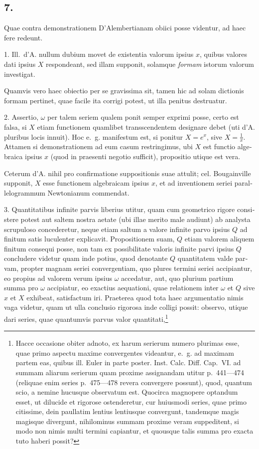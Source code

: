 \documentclass[12pt,a4paper]{article}
\begin{document}
\begin{otherlanguage}{latin}
\subsection*{7.}
Quae contra demonstrationem D'Alembertianam obiici posse videntur, ad haec fere redeunt.

1. Ill.~d'A. nullum dubium movet de existentia valorum ipsius $x$, quibus valores dati ipsius $X$ respondeant, sed illam supponit, solamque \textit{formam} istorum valorum investigat.

Quamvis vero haec obiectio per se gravissima sit, tamen hic ad solam dictionis formam pertinet, quae facile ita corrigi potest, ut illa penitus destruatur.

2. Assertio, $\omega$ per talem seriem qualem ponit semper exprimi posse, certo est falsa, si $X$ etiam functionem quamlibet transscendentem designare debet (uti d'A. pluribus locis innuit). Hoc e.~g. manifestum est, si ponitur $X=e^{x}$, sive $X=\frac{1}{x}$. Attamen si demonstrationem ad eum casum restringimus, ubi $X$ est functio algebraica ipsius $x$ (quod in praesenti negotio sufficit), propositio utique est vera.

Ceterum d'A. nihil pro confirmatione suppositionis suae attulit; cel. Bougainville supponit, $X$ esse functionem algebraicam ipsius $x$, et ad inventionem seriei parallelogrammum Newtonianum commendat.

3. Quantitatibus infinite parvis liberius utitur, quam cum geometrico rigore consistere potest aut saltem nostra aetate (ubi illae merito male audiunt) ab analysta scrupuloso concederetur, neque etiam saltum a valore infinite parvo ipsius $Q$ ad finitum satis luculenter explicavit. Propositionem suam, $Q$ etiam valorem aliquem finitum consequi posse, non tam ex possibilitate valoris infinite parvi ipsius $Q$ concludere videtur quam inde potius, quod denotante $Q$ quantitatem valde parvam, propter magnam seriei convergentiam, quo plures termini seriei accipiantur, eo propius ad valorem verum ipsius $\omega$ accedatur, aut, quo plurium partium summa pro $\omega$ accipiatur, eo exactius aequationi, quae relationem inter $\omega$ et $Q$ sive $x$ et $X$ exhibeat, satisfactum iri. Praeterea quod tota haec argumentatio nimis vaga videtur, quam ut ulla conclusio rigorosa inde colligi possit: observo, utique dari series, quae quantumvis parvus valor quantitati,\footnote{Hacce occasione obiter adnoto, ex harum serierum numero plurimas esse, quae primo aspectu maxime convergentes videantur, e.~g. ad maximam partem eas, quibus ill. Euler in parte poster. Inst. Calc. Diff. Cap.~VI. ad summam aliarum serierum quam proxime assignandam utitur p.~441---474 (reliquae enim series p.~475---478 revera convergere possunt), quod, quantum scio, a nemine hucusque observatum est. Quocirca magnopere optandum esset, ut dilucide et rigorose ostenderetur, cur huiusmodi series, quae primo citissime, dein paullatim lentius lentiusque convergunt, tandemque magis magisque divergunt, nihilominus summam proxime veram suppeditent, si modo non nimis multi termini capiantur, et quousque talis summa pro exacta tuto haberi possit?}


\end{otherlanguage}
\end{document}
